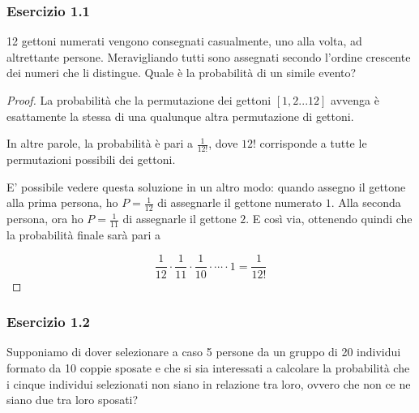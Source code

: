 \documentclass{beamer}
\begin{document}
\begin{frame}[fragile]
	\frametitle{Esercizio 1.1}
	
	\begin{exercise}
	12 gettoni numerati vengono consegnati casualmente, uno alla volta, ad altrettante persone. Meravigliando tutti sono assegnati secondo l'ordine crescente dei numeri che li distingue. Quale è la probabilità di un simile evento?
    \end{exercise}
\end{frame}

\begin{frame}

    \begin{proof}
	La probabilità che la permutazione dei gettoni $[1, 2...12]$ avvenga è esattamente la stessa di una qualunque altra permutazione di gettoni.
	
	In altre parole, la probabilità è pari a $\frac{1}{12!}$, dove $12!$ corrisponde a tutte le permutazioni possibili dei gettoni.
	
	\medskip
	
	E' possibile vedere questa soluzione in un altro modo: quando assegno il gettone alla prima persona, ho $P = \frac{1}{12}$ di assegnarle il gettone numerato $1$. Alla seconda persona, ora ho $P =\frac{1}{11}$ di assegnarle il gettone $2$. E così via, ottenendo quindi che la probabilità finale sarà pari a
	
	\[
        \frac{1}{12} \cdot \frac{1}{11} \cdot \frac{1}{10} \cdot \cdots \cdot 1 = \frac{1}{12!}
    \]
    
    \qedhere
\end{proof}

\end{frame}

\begin{frame}[fragile]
	\frametitle{Esercizio 1.2}
	
	\begin{exercise}
	Supponiamo di dover selezionare a caso 5 persone da un gruppo di 20 individui formato da 10 coppie sposate e che si sia interessati a calcolare la probabilità che i cinque individui selezionati non siano in relazione tra loro, ovvero che non ce ne siano due tra loro sposati?
    \end{exercise}
\end{frame}
\end{document}

